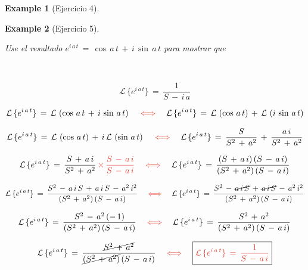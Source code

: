 \documentclass[a4paper,11pt,openany]{book}
\newtheorem{exmp}{Example}[section]
\begin{document}
\begin{exmp}[Ejercicio 4]
 
\end{exmp}
 
\begin{exmp}[Ejercicio 5]
 
 
\
 
Use el resultado $e^{i\,a\,t}\,=\,\cos\,a\,t\,+\,i\,\sin\,a\,t$ para mostrar que 
 
\ 
 
$$\boxed{\mathcal{L}\,\{e^{i\,a\,t} \}\,=\,\dfrac{1}{S\,-\,i\,a} }$$
 
$$\mathcal{L}\,\{e^{i\,a\,t} \}\,=\,\mathcal{L}\,\left(\cos\,a\,t\,+\,i\,\sin\,a\,t \right) \quad \textcolor{vermilion}{\iff} \quad \mathcal{L}\,\{e^{i\,a\,t} \}\,=\,\mathcal{L}\,\left(\cos\,a\,t \right)\,+\,\mathcal{L}\,\left(i\,\sin\,a\,t \right)$$
 
$$\mathcal{L}\,\{e^{i\,a\,t} \}\,=\,\mathcal{L}\,\left(\cos\,a\,t \right)\,+\,i\,\mathcal{L}\,\left(\sin\,a\,t \right) \quad \textcolor{vermilion}{\iff} \quad \mathcal{L}\,\{e^{i\,a\,t} \}\,=\,\dfrac{S}{S^{2}\,+\,a^{2}}\,+\,\dfrac{a\,i}{S^{2}\,+\,a^{2}}$$
 
$$\mathcal{L}\,\{e^{i\,a\,t} \}\,=\,\dfrac{S\,+\,a\,i}{S^{2}\,+\,a^{2}}\,\textcolor{vermilion}{\times}\,\textcolor{vermilion}{\dfrac{S\,-\,a\,i}{S\,-\,a\,i}} \quad \textcolor{vermilion}{\iff} \quad \mathcal{L}\,\{e^{i\,a\,t} \}\,=\,\dfrac{(S\,+\,a\,i)\,(S\,-\,a\,i)}{(S^{2}\,+\,a^{2})\,(S\,-\,a\,i) } $$
 
$$\mathcal{L}\,\{e^{i\,a\,t} \}\,=\,\dfrac{S^{2}\,-\,a\,i\,S\,+\,a\,i\,S\,-\,a^{2}\,i^{2} }{(S^{2}\,+\,a^{2})\,(S\,-\,a\,i) } \quad \textcolor{vermilion}{\iff} \quad  \mathcal{L}\,\{e^{i\,a\,t} \}\,=\,\dfrac{S^{2}\,-\,\cancel{a\,i\,S}\,+\,\cancel{a\,i\,S}\,-\,a^{2}\,i^{2} }{(S^{2}\,+\,a^{2})\,(S\,-\,a\,i) }$$
 
$$\mathcal{L}\,\{e^{i\,a\,t} \}\,=\,\dfrac{S^{2}\,-\,a^{2}\,(-\,1) }{(S^{2}\,+\,a^{2})\,(S\,-\,a\,i) } \quad \textcolor{vermilion}{\iff} \quad \mathcal{L}\,\{e^{i\,a\,t} \}\,=\,\dfrac{S^{2}\,+\,a^{2} }{(S^{2}\,+\,a^{2})\,(S\,-\,a\,i) }$$
 
$$\mathcal{L}\,\{e^{i\,a\,t} \}\,=\,\dfrac{\cancel{S^{2}\,+\,a^{2}} }{\cancel{(S^{2}\,+\,a^{2})}\,(S\,-\,a\,i) } \quad \textcolor{vermilion}{\iff} \quad \boxed{\textcolor{vermilion}{\mathcal{L}\,\{e^{i\,a\,t} \}\,=\,\dfrac{1}{S\,-\,a\,i} } } $$
 
\end{exmp}
 
\end{document}
